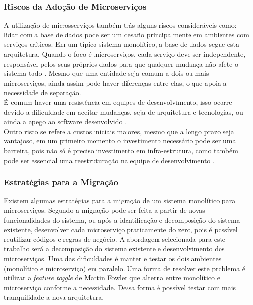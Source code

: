 \documentclass[12pt]{article}
\begin{document}
\subsubsection{Riscos da Adoção de Microserviços}
A utilização de microsserviços também trás alguns riscos consideráveis como: lidar com a base de dados pode ser um desafio principalmente em ambientes com serviços críticos. Em um típico sistema monolítico, a base de dados segue esta arquitetura. Quando o foco é microserviços, cada serviço deve ser independente, responsável pelos seus próprios dados para que qualquer mudança não afete o sistema todo \cite{Kholy2019}. Mesmo que uma entidade seja comum a dois ou mais microserviços, ainda assim pode haver diferenças entre elas, o que apoia a necessidade de separação. 
\\É comum haver uma resistência em equipes de desenvolvimento, isso ocorre devido a dificuldade em aceitar mudanças, seja de arquitetura e tecnologias, ou ainda a apego ao software desenvolvido \cite{Taibi}. 
\\Outro risco se refere a custos iniciais maiores, mesmo que a longo prazo seja vantajoso, em um primeiro momento o investimento necessário pode ser uma barreira, pois não só é preciso investimento em infra-estrutura, como também pode ser essencial uma reestruturação na equipe de desenvolvimento \cite{Taibi}.

\subsubsection{Estratégias para a Migração}

Existem algumas estratégias para a migração de um sistema monolítico para microserviços. Segundo \cite{Taibi} a migração pode ser feita a partir de novas funcionalidades do sistema, ou após a identificação e decomposição do sistema existente, desenvolver cada microserviço praticamente do zero, pois é possível reutilizar códigos e regras de negócio. A abordagem selecionada para este trabalho será a decomposição do sistema existente e desenvolvimento dos microserviços. Uma das dificuldades é manter e testar os dois ambientes (monolítico e microserviço) em paralelo. Uma forma de resolver este problema é utilizar a \textit{feature toggle} de Martin Fowler \cite{Carvalho2019} que alterna entre monolítico e microserviço conforme a necessidade. Dessa forma é possível testar com mais tranquilidade a nova arquitetura. 
\end{document}
